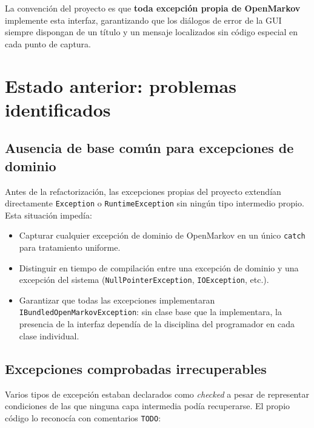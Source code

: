 \documentclass[12pt,a4paper]{article}
\begin{document}
La convención del proyecto es que \textbf{toda excepción propia de OpenMarkov}
implemente esta interfaz, garantizando que los diálogos de error de la GUI
siempre dispongan de un título y un mensaje localizados sin código especial
en cada punto de captura.

\section{Estado anterior: problemas identificados}
\label{sec:problemas}

\subsection{Ausencia de base común para excepciones de dominio}
\label{sec:prob-base}

Antes de la refactorización, las excepciones propias del proyecto extendían
directamente \texttt{Exception} o \texttt{RuntimeException} sin ningún tipo
intermedio propio. Esta situación impedía:

\begin{itemize}
  \item Capturar cualquier excepción de dominio de OpenMarkov en un único
    \texttt{catch} para tratamiento uniforme.
  \item Distinguir en tiempo de compilación entre una excepción de dominio y
    una excepción del sistema (\texttt{NullPointerException},
    \texttt{IOException}, etc.).
  \item Garantizar que todas las excepciones implementaran
    \texttt{IBundledOpenMarkovException}: sin clase base que la implementara,
    la presencia de la interfaz dependía de la disciplina del programador en
    cada clase individual.
\end{itemize}

\subsection{Excepciones comprobadas irrecuperables}
\label{sec:prob-checked}

Varios tipos de excepción estaban declarados como \emph{checked} a pesar de
representar condiciones de las que ninguna capa intermedia podía recuperarse.
El propio código lo reconocía con comentarios \texttt{TODO}:
\end{document}
